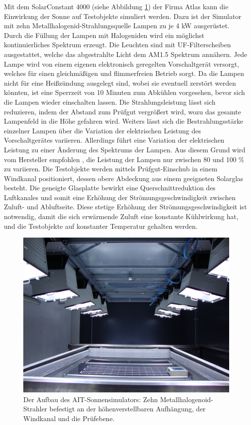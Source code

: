 \documentclass[a4paper,bibtotoc,oneside]{scrbook}
\begin{document}
Mit dem SolarConstant 4000 (siehe Abbildung \ref{sunsim}) der Firma Atlas kann die Einwirkung der Sonne auf Testobjekte simuliert werden. Dazu ist der Simulator mit zehn Metallhalogenid-Strahlungsquelle Lampen zu je 4 kW ausgerüstet. Durch die Füllung der Lampen mit Halogeniden wird ein möglichst kontinuierliches Spektrum erzeugt. Die Leuchten sind mit UF-Filterscheiben ausgestattet, welche das abgestrahlte Licht dem AM1.5 Spektrum annähern.
Jede Lampe wird von einem eigenen elektronisch geregelten Vorschaltgerät versorgt, welches für einen gleichmäßigen und flimmerfreien Betrieb sorgt.
Da die Lampen nicht für eine Heißzündung ausgelegt sind, wobei sie eventuell zerstört werden könnten, ist eine Sperrzeit von 10 Minuten zum Abkühlen vorgesehen, bevor sich die Lampen wieder einschalten lassen.
Die Strahlungsleistung lässt sich reduzieren, indem der Abstand zum Prüfgut vergrößert wird, wozu das gesamte Lampenfeld in die Höhe gefahren wird.
Weiters lässt sich die Bestrahlungsstärke einzelner Lampen über die Variation der elektrischen Leistung des Vorschaltgerätes variieren.
Allerdings führt eine Variation der elektrischen Leistung zu einer Änderung des Spektrums der Lampen. Aus diesem Grund wird vom Hersteller empfohlen \cite{atlas}, die Leistung der Lampen nur zwischen 80 und 100 \% zu variieren.
Die Testobjekte werden mittels Prüfgut-Einschub in einem Windkanal positioniert, dessen obere Abdeckung aus einem geeigneten Solarglas besteht. Die geneigte Glasplatte bewirkt eine Querschnittreduktion des Luftkanales und somit eine Erhöhung der Strömungsgeschwindigkeit zwischen Zuluft- und Abluftseite. Diese stetige Erhöhung der Strömungsgeschwindigkeit ist notwendig, damit die sich erwärmende Zuluft eine konstante Kühlwirkung hat, und die Testobjekte auf konstanter Temperatur gehalten werden.


\begin{figure}[htbp]
\centering
\includegraphics[width=125mm]{img/sunsimulator.jpg}
\caption[Sonnensimulator]{Der Aufbau des AIT-Sonnensimulators: Zehn Metallhalogenoid-Strahler befestigt an der höhenverstellbaren Aufhängung, der Windkanal und die Prüfebene.}\label{sunsim}
\end{figure}
\end{document}
